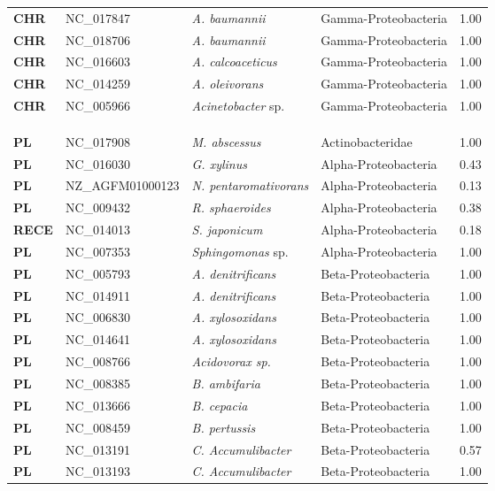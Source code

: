 \begin{adjustwidth}{-3cm}{2cm}
{\begin{supertabular}{>{\bfseries}l|p{0.1\textwidth}p{0.14\textwidth}l|l}
CHR & NC\_017847 & \textit{A. baumannii} & Gamma-Proteobacteria & 1.00\\
CHR & NC\_018706 & \textit{A. baumannii} & Gamma-Proteobacteria & 1.00\\
CHR & NC\_016603 & \textit{A. calcoaceticus} & Gamma-Proteobacteria & 1.00\\
CHR & NC\_014259 & \textit{A. oleivorans} & Gamma-Proteobacteria & 1.00\\
CHR & NC\_005966 & \textit{Acinetobacter} sp. & Gamma-Proteobacteria & 1.00\\
\\
\\
\hline\\
PL & NC\_017908 & \textit{M. abscessus} & Actinobacteridae & 1.00\\
PL & NC\_016030 & \textit{G. xylinus} & Alpha-Proteobacteria & 0.43\\
PL & NZ\_AGFM01000123 & \textit{N. pentaromativorans} & Alpha-Proteobacteria & 0.13\\
PL & NC\_009432 & \textit{R. sphaeroides} & Alpha-Proteobacteria & 0.38\\
RECE & NC\_014013 & \textit{S. japonicum} & Alpha-Proteobacteria & 0.18\\
PL & NC\_007353 & \textit{Sphingomonas} sp. & Alpha-Proteobacteria & 1.00\\
PL & NC\_005793 & \textit{A. denitrificans} & Beta-Proteobacteria & 1.00\\
PL & NC\_014911 & \textit{A. denitrificans} & Beta-Proteobacteria & 1.00\\
PL & NC\_006830 & \textit{A. xylosoxidans} & Beta-Proteobacteria & 1.00\\
PL & NC\_014641 & \textit{A. xylosoxidans} & Beta-Proteobacteria & 1.00\\
PL & NC\_008766 & \textit{Acidovorax sp. } & Beta-Proteobacteria & 1.00\\
PL & NC\_008385 & \textit{B. ambifaria} & Beta-Proteobacteria & 1.00\\
PL & NC\_013666 & \textit{B. cepacia} & Beta-Proteobacteria & 1.00\\
PL & NC\_008459 & \textit{B. pertussis} & Beta-Proteobacteria & 1.00\\
PL & NC\_013191 & \textit{C. Accumulibacter} & Beta-Proteobacteria & 0.57\\
PL & NC\_013193 & \textit{C. Accumulibacter} & Beta-Proteobacteria & 1.00\\

\end{supertabular}}
\end{adjustwidth}
